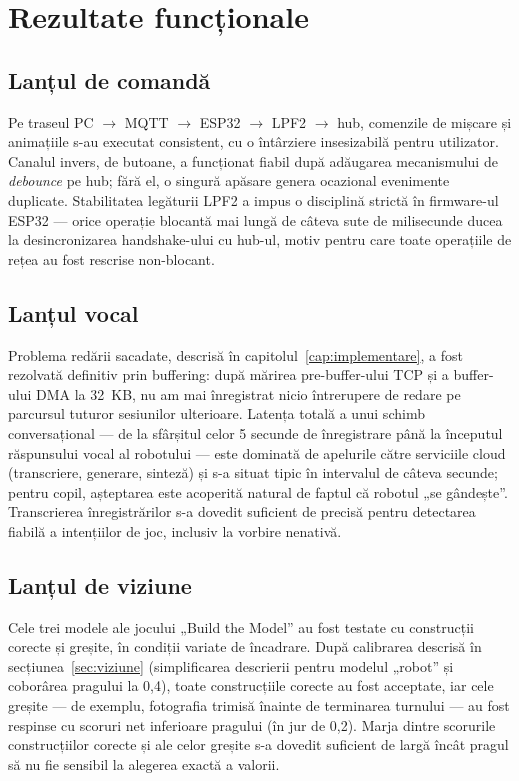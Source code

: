 \section{Rezultate funcționale}

\subsection{Lanțul de comandă}

Pe traseul PC $\rightarrow$ MQTT $\rightarrow$ ESP32 $\rightarrow$ LPF2 $\rightarrow$ hub, comenzile de mișcare și animațiile s-au executat consistent, cu o întârziere insesizabilă pentru utilizator. Canalul invers, de butoane, a funcționat fiabil după adăugarea mecanismului de \emph{debounce} pe hub; fără el, o singură apăsare genera ocazional evenimente duplicate. Stabilitatea legăturii LPF2 a impus o disciplină strictă în firmware-ul ESP32 — orice operație blocantă mai lungă de câteva sute de milisecunde ducea la desincronizarea handshake-ului cu hub-ul, motiv pentru care toate operațiile de rețea au fost rescrise non-blocant.

\subsection{Lanțul vocal}

Problema redării sacadate, descrisă în capitolul~\ref{cap:implementare}, a fost rezolvată definitiv prin buffering: după mărirea pre-buffer-ului TCP și a buffer-ului DMA la 32~KB, nu am mai înregistrat nicio întrerupere de redare pe parcursul tuturor sesiunilor ulterioare. Latența totală a unui schimb conversațional — de la sfârșitul celor 5 secunde de înregistrare până la începutul răspunsului vocal al robotului — este dominată de apelurile către serviciile cloud (transcriere, generare, sinteză) și s-a situat tipic în intervalul de câteva secunde; pentru copil, așteptarea este acoperită natural de faptul că robotul „se gândește”. Transcrierea înregistrărilor s-a dovedit suficient de precisă pentru detectarea fiabilă a intențiilor de joc, inclusiv la vorbire nenativă.

\subsection{Lanțul de viziune}

Cele trei modele ale jocului „Build the Model” au fost testate cu construcții corecte și greșite, în condiții variate de încadrare. După calibrarea descrisă în secțiunea~\ref{sec:viziune} (simplificarea descrierii pentru modelul „robot” și coborârea pragului la 0,4), toate construcțiile corecte au fost acceptate, iar cele greșite — de exemplu, fotografia trimisă înainte de terminarea turnului — au fost respinse cu scoruri net inferioare pragului (în jur de 0,2). Marja dintre scorurile construcțiilor corecte și ale celor greșite s-a dovedit suficient de largă încât pragul să nu fie sensibil la alegerea exactă a valorii.

